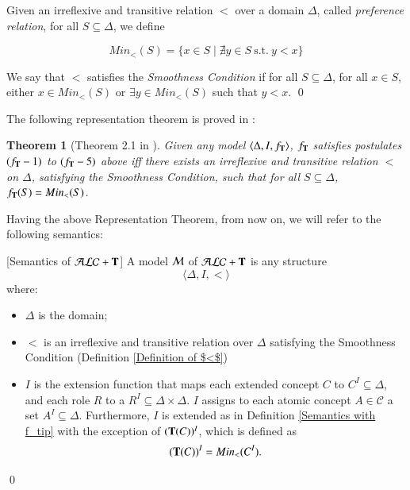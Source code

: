\documentclass[a4paper, 11pt, oneside]{elsarticle}
\newcommand{\tip}{{\bf T}}
\newcommand{\alct}{\mathcal{ALC}+\tip}
\newcommand{\tc} {\mid}
\newcommand{\emme} {\begin{mathcal}M\end{mathcal}}
\newenvironment{definition}
{\begin{defi} \rm}{\qed \end{defi}}
\newtheorem{theorem}{Theorem}
\newcounter{posu}
\newtheorem{theorem}[posu]{Theorem}
\newtheorem{definition}[posu]{Definition}
\begin{document}
\begin{definition}\label{Definition of $<$} Given an irreflexive and transitive relation  $<$ over a domain
$\Delta$, called \emph{preference relation}, for all $S \subseteq \Delta$,
 we define

 $$Min_<(S)= \{x \in S \tc \nexists y \in S \ \mbox{s.t.} \ y < x \}$$


\noindent We say that $<$ satisfies the {\em Smoothness Condition}
if for all $S \subseteq \Delta$, for all $x \in S$, either $x \in Min_<(S)$ or
$\exists y \in  Min_<(S)$ such that $y < x$.
\end{definition}


\noindent The following representation theorem is proved in \cite{FI09}:

\begin{theorem}[Theorem 2.1 in \cite{FI09}]\label{rtrt} Given any model $\langle \Delta, I, f_\tip
\rangle$,
  $f_\tip$ satisfies postulates $(f_\tip-1)$ to $(f_\tip-5)$ above iff there exists  an irreflexive and transitive relation $<$ on $\Delta$,
satisfying the Smoothness Condition, such that for all $S \subseteq \Delta$, $f_\tip(S)
= Min_<(S)$.
\end{theorem}


\noindent Having the above Representation Theorem, from now on, we will refer
to the following semantics:

\begin{definition}[Semantics of $\alct$]\label{Semantics of T} A model $\emme$ of $\alct$ is any
structure $$\langle \Delta, I, < \rangle$$ where:

\begin{itemize}

\item $\Delta$ is the domain;

\item $<$ is an irreflexive and transitive
relation over $\Delta$ satisfying the Smoothness
Condition (Definition \ref{Definition of $<$})

\item $I$ is the extension function that
maps each  extended concept $C$ to $C^I \subseteq \Delta$, and
each role $R$ to a $R^I \subseteq \Delta \times \Delta$. $I$
assigns to each atomic concept $A \in \mathcal{C}$ a set $A^I
\subseteq \Delta$. Furthermore, $I$ is extended as in Definition
\ref{Semantics with f_tip} with the exception of $(\tip(C))^I$,
which is defined as
$$(\tip(C))^I = Min_<(C^I).$$
\end{itemize}

\end{definition}
\end{document}
